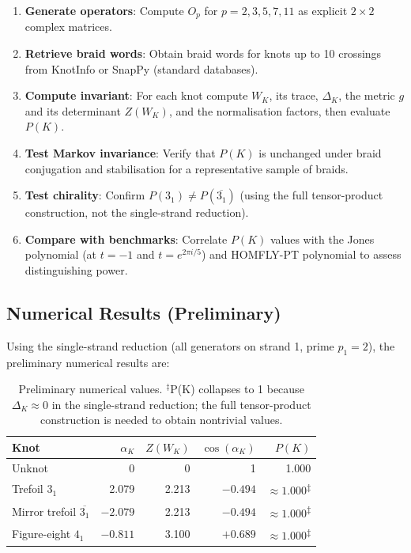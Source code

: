 \documentclass[11pt]{article}
\begin{document}
\begin{enumerate}
  \item \textbf{Generate operators}: Compute $O_p$ for $p=2,3,5,7,11$ as explicit $2\times2$ complex matrices.
  \item \textbf{Retrieve braid words}: Obtain braid words for knots up to 10 crossings from KnotInfo or SnapPy (standard databases).
  \item \textbf{Compute invariant}: For each knot compute $W_K$, its trace, $\Delta_K$, the metric $g$ and its determinant $Z(W_K)$, and the normalisation factors, then evaluate $P(K)$.
  \item \textbf{Test Markov invariance}: Verify that $P(K)$ is unchanged under braid conjugation and stabilisation for a representative sample of braids.
  \item \textbf{Test chirality}: Confirm $P(3_1)\neq P(\overline{3_1})$ (using the full tensor-product construction, not the single-strand reduction).
  \item \textbf{Compare with benchmarks}: Correlate $P(K)$ values with the Jones polynomial (at $t=-1$ and $t=e^{2\pi i/5}$) and HOMFLY-PT polynomial to assess distinguishing power.
\end{enumerate}

\subsection{Numerical Results (Preliminary)}

Using the single-strand reduction (all generators on strand 1, prime $p_1=2$), the preliminary numerical results are:

\begin{table}[h!]
\centering
\begin{tabular}{@{}lrrrr@{}}
\toprule
Knot & $\alpha_K$ & $Z(W_K)$ & $\cos(\alpha_K)$ & $P(K)$\\
\midrule
Unknot & 0 & 0 & 1 & 1.000\\
Trefoil $3_1$ & 2.079 & 2.213 & $-0.494$ & $\approx1.000$\textsuperscript{$\ddagger$}\\
Mirror trefoil $\overline{3_1}$ & $-2.079$ & 2.213 & $-0.494$ & $\approx1.000$\textsuperscript{$\ddagger$}\\
Figure-eight $4_1$ & $-0.811$ & 3.100 & $+0.689$ & $\approx1.000$\textsuperscript{$\ddagger$}\\
\bottomrule
\end{tabular}
\caption{Preliminary numerical values. $^\ddagger$P(K) collapses to 1 because $\Delta_K\approx0$ in the single-strand reduction; the full tensor-product construction is needed to obtain nontrivial values.}
\end{table}
\end{document}
